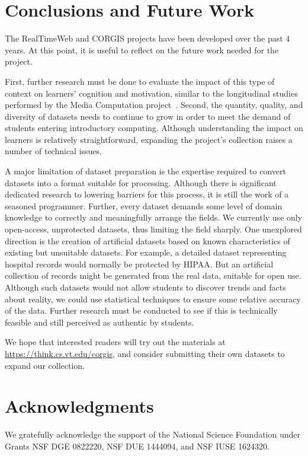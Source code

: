 \documentclass{sig-alternate}
\begin{document}
\section{Conclusions and Future Work}

The RealTimeWeb and CORGIS projects have been developed over the past 4 years.
At this point, it is useful to reflect on the future work needed for the project.

First, further research must be done to evaluate the impact of this type of context on learners' cognition and motivation, similar to the longitudinal studies performed by the Media Computation project~\cite{guzdial2013exploring}.
Second, the quantity, quality, and diversity of datasets needs to continue to grow in order to meet the demand of students entering introductory computing.
Although understanding the impact on learners is relatively straightforward, expanding the project's collection raises a number of technical issues.

A major limitation of dataset preparation is the expertise required to convert datasets into a format suitable for processing.
Although there is significant dedicated research to lowering barriers for this process, it is still the work of a seasoned programmer.
Further, every dataset demands some level of domain knowledge to correctly and meaningfully arrange the fields.
We currently use only open-access, unprotected datasets, thus limiting the field sharply.
One unexplored direction is the creation of artificial datasets based on known characteristics of existing but unsuitable datasets.
For example, a detailed dataset representing hospital records would normally be protected by HIPAA.
But an artificial collection of records might be generated from the real data, suitable for open use.
Although such datasets would not allow students to discover trends and facts about reality, we could use statistical techniques to ensure some relative accuracy of the data.
Further research must be conducted to see if this is technically feasible and still perceived as authentic by students.

We hope that interested readers will try out the materials at \url{https://think.cs.vt.edu/corgis}, and consider submitting their own datasets to expand our collection.

\section{Acknowledgments}

We gratefully acknowledge the support of the National Science Foundation under Grants NSF DGE 0822220, NSF DUE 1444094, and NSF IUSE
1624320.



\end{document}
